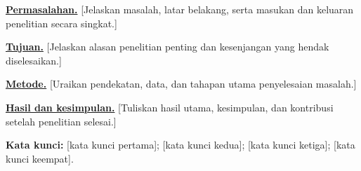 \begingroup\fontsize{11}{20.13}\selectfont

\textbf{\uline{Permasalahan.}} [Jelaskan masalah, latar belakang, serta masukan dan keluaran penelitian secara singkat.]

\textbf{\uline{Tujuan.}} [Jelaskan alasan penelitian penting dan kesenjangan yang hendak diselesaikan.]

\textbf{\uline{Metode.}} [Uraikan pendekatan, data, dan tahapan utama penyelesaian masalah.]

\textbf{\uline{Hasil dan kesimpulan.}} [Tuliskan hasil utama, kesimpulan, dan kontribusi setelah penelitian selesai.]

\textbf{Kata kunci:} [kata kunci pertama]; [kata kunci kedua]; [kata kunci ketiga]; [kata kunci keempat].

\par\endgroup
